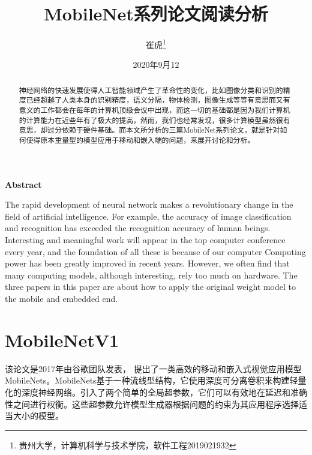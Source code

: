 \documentclass[UTF8,a4paper,12pt]{ctexart}
\title{\textbf{\Large{MobileNet系列论文阅读分析}}}
\author{ 崔虎\thanks{贵州大学，计算机科学与技术学院，软件工程2019021932} }
\date{2020年9月12}
\begin{document}
 
\newpage


\tableofcontents
\maketitle
 
\begin{abstract}
{\kaishu 神经网络的快速发展使得人工智能领域产生了革命性的变化，比如图像分类和识别的精度已经超越了人类本身的识别精度，语义分隔，物体检测，图像生成等等有意思而又有意义的工作都会在每年的计算机顶级会议中出现，而这一切的基础都是因为我们计算机的计算能力在近些年有了极大的提高，然而，我们也经常发现，很多计算模型虽然很有意思，却过分依赖于硬件基础。而本文所分析的三篇MobileNet系列论文，就是针对如何使得原本重量型的模型应用于移动和嵌入端的问题，来展开讨论和分析。}
\end{abstract}
 
\begin{center}
\large{\textbf{Abstract}}
\end{center}
 
\begin{adjustwidth}{1cm}{1cm}
\hspace{1.5em}The rapid development of neural network makes a revolutionary change in the field of artificial intelligence. For example, the accuracy of image classification and recognition has exceeded the recognition accuracy of human beings. Interesting and meaningful work will appear in the top computer conference every year, and the foundation of all these is because of our computer Computing power has been greatly improved in recent years. However, we often find that many computing models, although interesting, rely too much on hardware. The three papers in this paper are about how to apply the original weight model to the mobile and embedded end.
\end{adjustwidth}
 
\thispagestyle{empty}       %
\newpage                    %
\newpage
\setcounter{page}{1}        %
 
 
\section{MobileNetV1}

	该论文是2017年由谷歌团队发表\cite{2017MobileNets}， 提出了一类高效的移动和嵌入式视觉应用模型MobileNets。MobileNets基于一种流线型结构，它使用深度可分离卷积来构建轻量化的深度神经网络。引入了两个简单的全局超参数，它们可以有效地在延迟和准确性之间进行权衡。这些超参数允许模型生成器根据问题的约束为其应用程序选择适当大小的模型。
	
\end{document}
